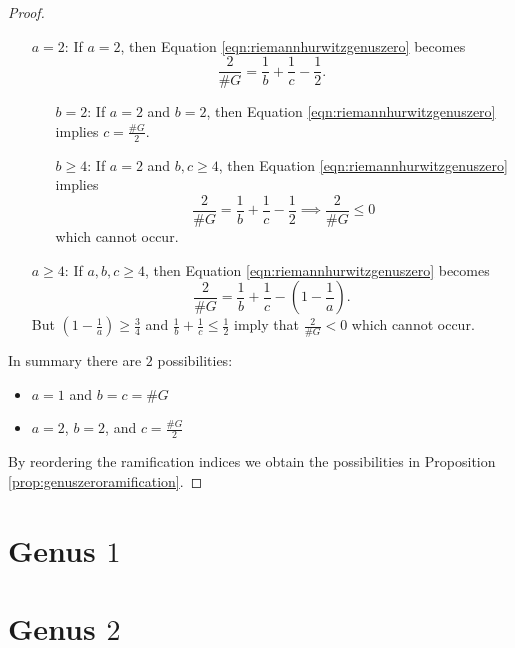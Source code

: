 \documentclass{dcthesis}
\theoremstyle{definition}
\theoremstyle{remark}
\numberwithin{equation}{section}
\numberwithin{figure}{section}
\begin{document}
{{\begin{proof}
\begin{itemize}
\begin{itemize}
\[                \implies
                \#G\left(2^{n-m}+1\right) = 2^{n+1}.
              \]
              Since $\#G$ is a power of $2$, we must have
              $2^{n-m}+1\in\{0,1\}$ which only occurs when $m=n$.
              Therefore $m=n$ which implies $b=c=\#G$.
          \end{itemize}
        \item[\underline{$a=2$}:]
          If $a=2$, then
          Equation \ref{eqn:riemannhurwitzgenuszero} becomes
          \[
            \frac{2}{\#G} = \frac{1}{b}+\frac{1}{c}-\frac{1}{2}.
          \]
          \begin{itemize}
            \item[\underline{$b=2$}:]
              If $a=2$ and $b=2$, then
              Equation \ref{eqn:riemannhurwitzgenuszero} implies
              $c=\frac{\#G}{2}$.
            \item[\underline{$b\ge 4$}:]
              If $a=2$ and $b,c\geq 4$, then
              Equation \ref{eqn:riemannhurwitzgenuszero} implies
              \[
                \frac{2}{\#G} = \frac{1}{b}+\frac{1}{c}-\frac{1}{2}
                \implies
                \frac{2}{\#G}\le 0
              \]
              which cannot occur.
          \end{itemize}
        \item[\underline{$a\geq 4$}:]
          If $a,b,c\geq 4$, then
          Equation \ref{eqn:riemannhurwitzgenuszero} becomes
          \[
            \frac{2}{\#G} = \frac{1}{b}+\frac{1}{c} - \left(1-\frac{1}{a}\right).
          \]
          But
          $\left(1-\frac{1}{a}\right)\ge\frac{3}{4}$
          and
          $\frac{1}{b}+\frac{1}{c}\le\frac{1}{2}$
          imply that
          $\frac{2}{\#G}<0$
          which cannot occur.
      \end{itemize}
      In summary there are $2$ possibilities:
      \begin{itemize}
        \item $a=1$ and $b=c=\#G$
        \item $a=2$, $b=2$, and $c=\frac{\#G}{2}$
      \end{itemize}
      By reordering the ramification indices
      we obtain the possibilities in Proposition \ref{prop:genuszeroramification}.
    \end{proof}
  }
  \section{Genus $1$}{\label{sec:genusone}
  }
  \section{Genus $2$}{\label{sec:genustwo}
  }
}
\end{document}
